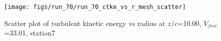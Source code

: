 \begin{figure}[H]
\centering
\texttt{[image: figs/run\_70/run\_70\_ctke\_vs\_r\_mesh\_scatter]}
\caption{Scatter plot of turbulent kinetic energy vs radius at $z/c$=10.00, $V_{free}$=33.01, station7}
\label{fig:run_70_ctke_vs_r_mesh_scatter}
\end{figure}



